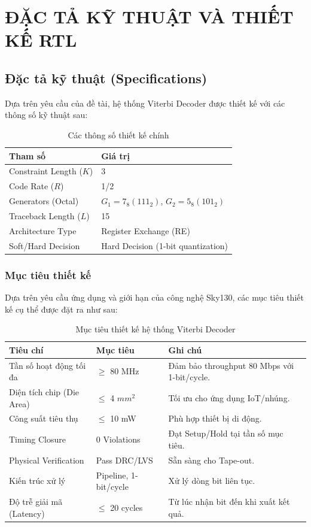 \documentclass[12pt,a4paper]{report}
\begin{document}
\chapter{ĐẶC TẢ KỸ THUẬT VÀ THIẾT KẾ RTL}

\section{Đặc tả kỹ thuật (Specifications)}
Dựa trên yêu cầu của đề tài, hệ thống Viterbi Decoder được thiết kế với các thông số kỹ thuật sau:

\begin{table}[H]
    \centering
    \caption{Các thông số thiết kế chính}
    \begin{tabular}{|l|l|}
    \hline
    \textbf{Tham số} & \textbf{Giá trị} \\ \hline
    Constraint Length ($K$) & 3 \\ \hline
    Code Rate ($R$) & 1/2 \\ \hline
    Generators (Octal) & $G_1 = 7_8 (111_2)$, $G_2 = 5_8 (101_2)$ \\ \hline
    Traceback Length ($L$) & 15 \\ \hline
    Architecture Type & Register Exchange (RE) \\ \hline
    Soft/Hard Decision & Hard Decision (1-bit quantization) \\ \hline
    \end{tabular}
\end{table}

\subsection{Mục tiêu thiết kế}
Dựa trên yêu cầu ứng dụng và giới hạn của công nghệ Sky130, các mục tiêu thiết kế cụ thể được đặt ra như sau:

\begin{table}[H]
    \centering
    \caption{Mục tiêu thiết kế hệ thống Viterbi Decoder}
    \begin{tabular}{|l|l|p{7cm}|}
    \hline
    \textbf{Tiêu chí} & \textbf{Mục tiêu} & \textbf{Ghi chú} \\ \hline
    Tần số hoạt động tối đa & $\geq$ 80 MHz & Đảm bảo throughput 80 Mbps với 1-bit/cycle. \\ \hline
    Diện tích chip (Die Area) & $\leq$ 4 $mm^2$ & Tối ưu cho ứng dụng IoT/nhúng. \\ \hline
    Công suất tiêu thụ & $\leq$ 10 mW & Phù hợp thiết bị di động. \\ \hline
    Timing Closure & 0 Violations & Đạt Setup/Hold tại tần số mục tiêu. \\ \hline
    Physical Verification & Pass DRC/LVS & Sẵn sàng cho Tape-out. \\ \hline
    Kiến trúc xử lý & Pipeline, 1-bit/cycle & Xử lý dòng bit liên tục. \\ \hline
    Độ trễ giải mã (Latency) & $\leq$ 20 cycles & Từ lúc nhận bit đến khi xuất kết quả. \\ \hline
    \end{tabular}
\end{table}
\end{document}
